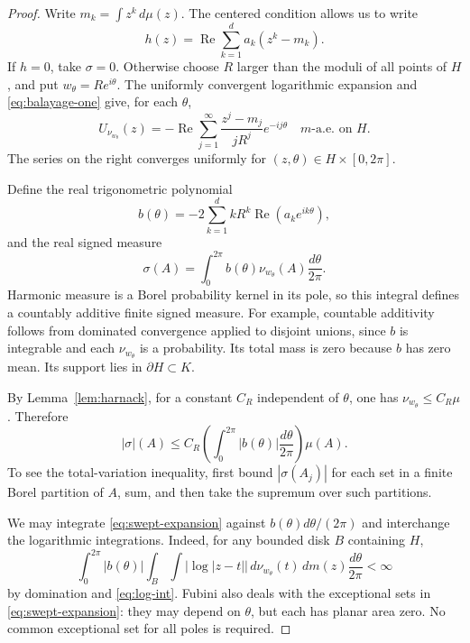 \documentclass[11pt]{article}
\DeclareMathOperator{\Rea}{Re}
\newcommand{\areaAE}{\text{a.e.}}
\theoremstyle{remark}
\numberwithin{equation}{section}
\begin{document}
\begin{proof}
Write $m_k=\int z^k\,d\mu(z)$. The centered condition allows us to
write
\begin{equation}\label{eq:h-expansion}
 h(z)=\Rea\sum_{k=1}^d a_k(z^k-m_k).
\end{equation}
If $h=0$, take $\sigma=0$. Otherwise choose $R$ larger than the
moduli of all points of $H$, and put $w_\theta=Re^{i\theta}$.
The uniformly convergent logarithmic expansion and
\eqref{eq:balayage-one} give, for each $\theta$,
\begin{equation}\label{eq:swept-expansion}
 U_{\nu_{w_\theta}}(z)
 =-\Rea\sum_{j=1}^{\infty}
       \frac{z^j-m_j}{jR^j}e^{-ij\theta}
 \quad m\text{-}\areaAE\text{ on }H.
\end{equation}
The series on the right converges uniformly for $(z,\theta)\in
H\times[0,2\pi]$.

Define the real trigonometric polynomial
\begin{equation}\label{eq:fourier-weight}
 b(\theta)=-2\sum_{k=1}^d kR^k\Rea(a_ke^{ik\theta}),
\end{equation}
and the real signed measure
\begin{equation}\label{eq:sigma}
 \sigma(A)=\int_0^{2\pi} b(\theta)\nu_{w_\theta}(A)
                          \frac{d\theta}{2\pi}.
\end{equation}
Harmonic measure is a Borel probability kernel in its pole, so this
integral defines a countably additive finite signed measure. For
example, countable additivity follows from dominated convergence
applied to disjoint unions, since $b$ is integrable and each
$\nu_{w_\theta}$ is a probability. Its total mass is zero because
$b$ has zero mean. Its support lies in $\partial H\subset K$.

By Lemma~\ref{lem:harnack}, for a constant $C_R$ independent of
$\theta$, one has $\nu_{w_\theta}\le C_R\mu$. Therefore
\begin{equation}\label{eq:variation-bound}
 |\sigma|(A)\le C_R\left(\int_0^{2\pi}|b(\theta)|
                       \frac{d\theta}{2\pi}\right)\mu(A).
\end{equation}
To see the total-variation inequality, first bound $|\sigma(A_j)|$
for each set in a finite Borel partition of $A$, sum, and then take
the supremum over such partitions.

We may integrate \eqref{eq:swept-expansion} against
$b(\theta)d\theta/(2\pi)$ and interchange the logarithmic integrations.
Indeed, for any bounded disk $B$ containing $H$,
\[
 \int_0^{2\pi}\!|b(\theta)|
 \int_B\!\int |\log|z-t||\,d\nu_{w_\theta}(t)\,dm(z)
 \frac{d\theta}{2\pi}<\infty
\]
by domination and \eqref{eq:log-int}. Fubini also deals with the
exceptional sets in \eqref{eq:swept-expansion}: they may depend on
$\theta$, but each has planar area zero. No common exceptional set
for all poles is required.


\end{proof}
\end{document}
